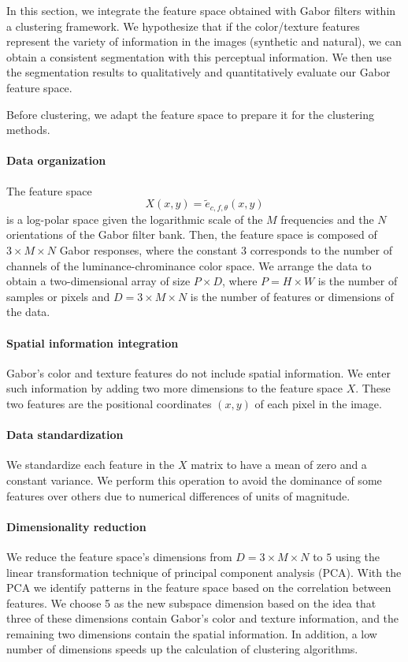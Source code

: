 In this section, we integrate the feature space obtained with Gabor filters within a clustering framework. We hypothesize that if the color/texture features represent the variety of information in the images (synthetic and natural), we can obtain a consistent segmentation with this perceptual information. We then use the segmentation results to qualitatively and quantitatively evaluate our Gabor feature space.

Before clustering, we adapt the feature space to prepare it for the clustering methods.

\paragraph{Data organization}
The feature space 
\begin{equation}\label{eq:feature_space_clustering}
	X(x,y) = \widetilde{e}_{c, f, \theta}(x,y)
\end{equation}
is a log-polar space given the logarithmic scale of the $M$ frequencies and the $N$ orientations of the Gabor filter bank. Then, the feature space is composed of $3 \times M \times N$ Gabor responses, where the constant $3$ corresponds to the number of channels of the luminance-chrominance color space. We arrange the data to obtain a two-dimensional array of size $P \times D$, where $P= H\times W$  is the number of samples or pixels and $D =3 \times M \times N$ is the number of features or dimensions of the data.

\paragraph{Spatial information integration}
Gabor's color and texture features do not include spatial information. We enter such information by adding two more dimensions to the feature space $X$. These two features are the positional coordinates $(x, y)$ of each pixel in the image. 

\paragraph{Data standardization}
We standardize each feature in the $X$ matrix to have a mean of zero and a constant variance. We perform this operation to avoid the dominance of some features over others due to numerical differences of units of magnitude.

\paragraph{Dimensionality reduction}
We reduce the feature space's dimensions from $D =3 \times M \times N$ to $5$ using the linear transformation technique of principal component analysis (PCA). With the PCA we identify patterns in the feature space based on the correlation between features. We choose 5 as the new subspace dimension based on the idea that three of these dimensions contain Gabor's color and texture information, and the remaining two dimensions contain the spatial information. In addition, a low number of dimensions speeds up the calculation of clustering algorithms.

